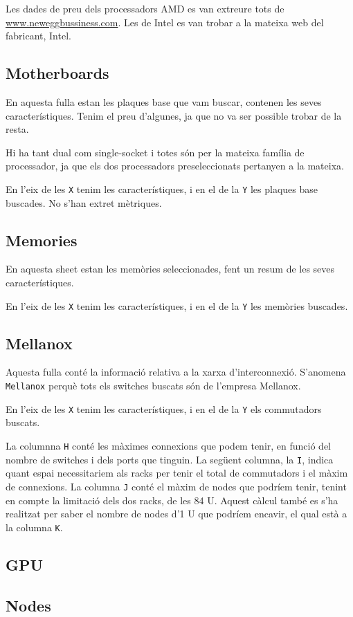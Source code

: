 Les dades de preu dels processadors AMD es van extreure tots de \url{www.neweggbussiness.com}. Les de Intel es van trobar a la mateixa web del fabricant, Intel.

\subsection{Motherboards}
En aquesta fulla estan les plaques base que vam buscar, contenen les seves característiques. Tenim el preu d'algunes, ja que no va ser possible trobar de la resta.

Hi ha tant dual com single-socket i totes són per la mateixa família de processador, ja que els dos processadors preseleccionats pertanyen a la mateixa.

En l'eix de les \texttt{X} tenim les característiques, i en el de la \texttt{Y} les plaques base buscades.
No s'han extret mètriques.

\subsection{Memories}
En aquesta sheet estan les memòries seleccionades, fent un resum de les seves característiques.

En l'eix de les \texttt{X} tenim les característiques, i en el de la \texttt{Y} les memòries buscades.

\subsection{Mellanox}
Aquesta fulla conté la informació relativa a la xarxa d'interconnexió. S'anomena \texttt{Mellanox} perquè tots els switches buscats són de l'empresa Mellanox.

En l'eix de les \texttt{X} tenim les característiques, i en el de la \texttt{Y} els commutadors buscats.

La columnna \texttt{H} conté les màximes connexions que podem tenir, en funció del nombre de switches i dels ports que tinguin. 
La següent columna, la \texttt{I}, indica quant espai necessitariem als racks per tenir el total de commutadors i el màxim de connexions.
La columna \texttt{J} conté el màxim de nodes que podríem tenir, tenint en compte la limitació dels dos racks, de les 84 U. 
Aquest càlcul també es s'ha realitzat per saber el nombre de nodes d'1 U que podríem encavir, el qual està a la columna \texttt{K}.

\subsection{GPU}

\subsection{Nodes}
